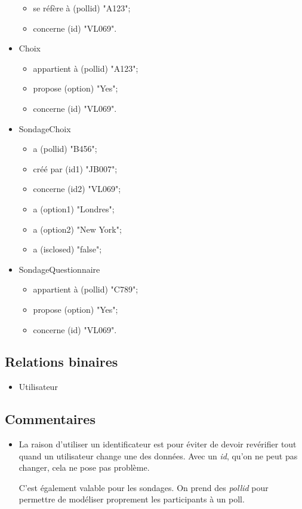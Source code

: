 \documentclass{article}
\begin{document}
\begin{itemize}
    \begin{itemize}
        \item se réfère à (pollid) "A123";
        \item concerne (id) "VL069".
    \end{itemize}
    \item Choix
    \begin{itemize}
        \item appartient à (pollid) "A123";
        \item propose (option) "Yes";
        \item concerne (id) "VL069".
    \end{itemize}
    \item SondageChoix
    \begin{itemize}
        \item a (pollid) "B456";
        \item créé par (id1) "JB007";
        \item concerne (id2) "VL069";
        \item a (option1) "Londres";
        \item a (option2) "New York";
        \item a (isclosed) "false";
    \end{itemize}
    \item SondageQuestionnaire
    \begin{itemize}
        \item appartient à (pollid) "C789";
        \item propose (option) "Yes";
        \item concerne (id) "VL069".
    \end{itemize}
\end{itemize}

\subsection{Relations binaires}

\begin{itemize}
     \item Utilisateur
     \begin{itemize}

     \end{itemize}
\end{itemize}

\subsection{Commentaires}

    \begin{itemize}
        \item La raison d'utiliser un identificateur est pour éviter de devoir revérifier tout quand un utilisateur change une des données. Avec un \textit{id}, qu'on ne peut pas changer, cela ne pose pas problème.

        C'est également valable pour les sondages. On prend des \textit{pollid} pour permettre de modéliser proprement les participants à un poll.
    \end{itemize}
\end{document}
